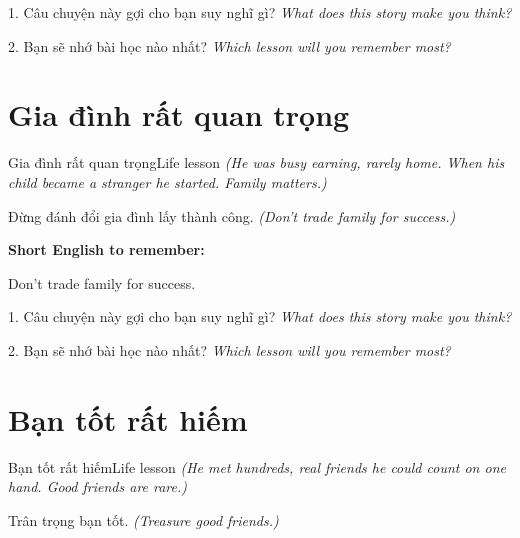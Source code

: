 \begin{tuhocnhanh}
1. Câu chuyện này gợi cho bạn suy nghĩ gì? \textit{What does this story make you think?}

2. Bạn sẽ nhớ bài học nào nhất? \textit{Which lesson will you remember most?}
\end{tuhocnhanh}
\ngancach


\section{Gia đình rất quan trọng}
\begin{truyen}{Gia đình rất quan trọng}{Life lesson}
\textit{(He was busy earning, rarely home. When his child became a stranger he started. Family matters.)}
\end{truyen}

\begin{baihoc}
Đừng đánh đổi gia đình lấy thành công.
\textit{(Don't trade family for success.)}
\end{baihoc}

\begin{ghinhoanh}
\textbf{Short English to remember:}

Don't trade family for success.

\end{ghinhoanh}

\begin{tuhocnhanh}
1. Câu chuyện này gợi cho bạn suy nghĩ gì? \textit{What does this story make you think?}

2. Bạn sẽ nhớ bài học nào nhất? \textit{Which lesson will you remember most?}
\end{tuhocnhanh}
\ngancach


\section{Bạn tốt rất hiếm}
\begin{truyen}{Bạn tốt rất hiếm}{Life lesson}
\textit{(He met hundreds, real friends he could count on one hand. Good friends are rare.)}
\end{truyen}

\begin{baihoc}
Trân trọng bạn tốt.
\textit{(Treasure good friends.)}
\end{baihoc}

